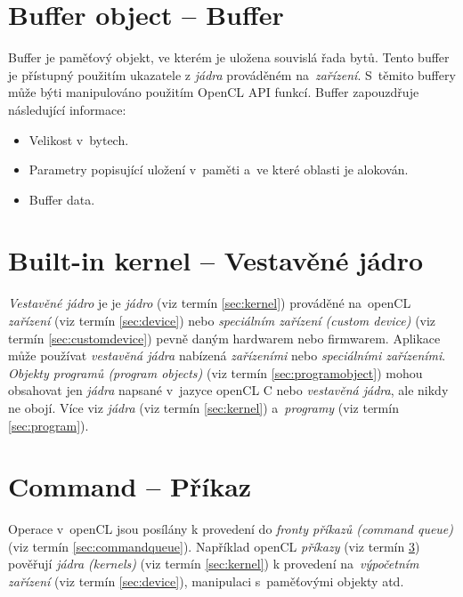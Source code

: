 \section{Buffer object  -- Buffer}
\label{sec:buffer}
Buffer je paměťový objekt, ve kterém je uložena souvislá řada bytů. Tento buffer
je přístupný použitím ukazatele z \emph{jádra} prováděném na~\emph{zařízení}. S~těmito buffery
může býti manipulováno použitím OpenCL API funkcí. Buffer zapouzdřuje následující
informace:

\begin{itemize}
\item Velikost v~bytech.
\item Parametry popisující uložení v~paměti a~ve které oblasti je alokován.
\item Buffer data.
\end{itemize}

\section{Built-in kernel -- Vestavěné jádro}
\label{sec:builtinkernel}

\emph{Vestavěné jádro} je je \emph{jádro} (viz termín \ref{sec:kernel}) prováděné na~openCL \emph{zařízení} (viz termín \ref{sec:device}) nebo \emph{speciálním zařízení (custom device)} (viz termín \ref{sec:customdevice}) pevně daným hardwarem nebo firmwarem. Aplikace může používat \emph{vestavěná jádra} nabízená \emph{zařízeními} nebo \emph{speciálními zařízeními}. \emph{Objekty programů 
(program objects)} (viz termín \ref{sec:programobject}) mohou obsahovat jen \emph{jádra} napsané v~jazyce openCL C nebo \emph{vestavěná jádra}, ale nikdy ne obojí. Více viz \emph{jádra} (viz termín \ref{sec:kernel}) a~\emph{programy} (viz termín \ref{sec:program}).

\section{Command -- Příkaz}
\label{sec:command}
Operace v~openCL jsou posílány k provedení do \emph{fronty příkazů (command queue)} (viz termín \ref{sec:commandqueue}).
Například openCL \emph{příkazy} (viz termín \ref{sec:command}) pověřují \emph{jádra (kernels)} (viz termín \ref{sec:kernel}) k provedení
na~\emph{výpočetním zařízení} (viz termín \ref{sec:device}), manipulaci s~paměťovými objekty atd.

